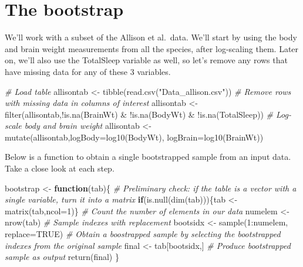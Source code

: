 \documentclass[
]{book}
\newenvironment{Shaded}{\begin{snugshade}}{\end{snugshade}}
\newcommand{\AttributeTok}[1]{\textcolor[rgb]{0.77,0.63,0.00}{#1}}
\newcommand{\CommentTok}[1]{\textcolor[rgb]{0.56,0.35,0.01}{\textit{#1}}}
\newcommand{\ConstantTok}[1]{\textcolor[rgb]{0.00,0.00,0.00}{#1}}
\newcommand{\ControlFlowTok}[1]{\textcolor[rgb]{0.13,0.29,0.53}{\textbf{#1}}}
\newcommand{\DecValTok}[1]{\textcolor[rgb]{0.00,0.00,0.81}{#1}}
\newcommand{\FunctionTok}[1]{\textcolor[rgb]{0.00,0.00,0.00}{#1}}
\newcommand{\NormalTok}[1]{#1}
\newcommand{\OtherTok}[1]{\textcolor[rgb]{0.56,0.35,0.01}{#1}}
\newcommand{\SpecialCharTok}[1]{\textcolor[rgb]{0.00,0.00,0.00}{#1}}
\newcommand{\StringTok}[1]{\textcolor[rgb]{0.31,0.60,0.02}{#1}}
\begin{document}
\hypertarget{the-bootstrap}{%
\section{The bootstrap}\label{the-bootstrap}}

We'll work with a subset of the Allison et al.~data. We'll start by using the body and brain weight measurements from all the species, after log-scaling them. Later on, we'll also use the TotalSleep variable as well, so let's remove any rows that have missing data for any of these 3 variables.

\begin{Shaded}
\begin{Highlighting}[]
\CommentTok{\# Load table}
\NormalTok{allisontab }\OtherTok{\textless{}{-}} \FunctionTok{tibble}\NormalTok{(}\FunctionTok{read.csv}\NormalTok{(}\StringTok{"Data\_allison.csv"}\NormalTok{))}
\CommentTok{\# Remove rows with missing data in columns of interest }
\NormalTok{allisontab }\OtherTok{\textless{}{-}} \FunctionTok{filter}\NormalTok{(allisontab,}\SpecialCharTok{!}\FunctionTok{is.na}\NormalTok{(BrainWt) }\SpecialCharTok{\&} \SpecialCharTok{!}\FunctionTok{is.na}\NormalTok{(BodyWt) }\SpecialCharTok{\&} \SpecialCharTok{!}\FunctionTok{is.na}\NormalTok{(TotalSleep))}
\CommentTok{\# Log{-}scale body and brain weight}
\NormalTok{allisontab }\OtherTok{\textless{}{-}} \FunctionTok{mutate}\NormalTok{(allisontab,}\AttributeTok{logBody=}\FunctionTok{log10}\NormalTok{(BodyWt), }\AttributeTok{logBrain=}\FunctionTok{log10}\NormalTok{(BrainWt))}
\end{Highlighting}
\end{Shaded}

Below is a function to obtain a single bootstrapped sample from an input data. Take a close look at each step.

\begin{Shaded}
\begin{Highlighting}[]
\NormalTok{bootstrap }\OtherTok{\textless{}{-}} \ControlFlowTok{function}\NormalTok{(tab)\{}
  \CommentTok{\# Preliminary check: if the table is a vector with a single variable, turn it into a matrix}
  \ControlFlowTok{if}\NormalTok{(}\FunctionTok{is.null}\NormalTok{(}\FunctionTok{dim}\NormalTok{(tab)))\{tab }\OtherTok{\textless{}{-}} \FunctionTok{matrix}\NormalTok{(tab,}\AttributeTok{ncol=}\DecValTok{1}\NormalTok{)\}}
  \CommentTok{\# Count the number of elements in our data}
\NormalTok{  numelem }\OtherTok{\textless{}{-}} \FunctionTok{nrow}\NormalTok{(tab)}
  \CommentTok{\# Sample indexes with replacement}
\NormalTok{  bootsidx }\OtherTok{\textless{}{-}} \FunctionTok{sample}\NormalTok{(}\DecValTok{1}\SpecialCharTok{:}\NormalTok{numelem, }\AttributeTok{replace=}\ConstantTok{TRUE}\NormalTok{)}
  \CommentTok{\# Obtain a boostrapped sample by selecting the bootstrapped indexes from the original sample}
\NormalTok{  final }\OtherTok{\textless{}{-}}\NormalTok{ tab[bootsidx,]}
  \CommentTok{\# Produce bootstrapped sample as output}
  \FunctionTok{return}\NormalTok{(final)}
\NormalTok{\}}
\end{Highlighting}
\end{Shaded}
\end{document}
